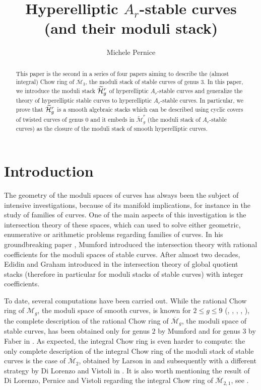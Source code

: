 \documentclass{alggeom}
\numberwithin{equation}{section}
\numberwithin{subsection}{section}
\theoremstyle{definition}
\theoremstyle{remark}
\newcommand\cM{\mathcal{M}} \newcommand\cN{\mathcal{N}}
\newcommand{\Mbar}{\overline{\cM}}
\newcommand{\Mtilde}{\widetilde{\mathcal M}}
\newcommand{\Htilde}{\widetilde{\cH}}
\begin{document}
\title{Hyperelliptic $A_r$-stable curves \\(and their moduli stack)}
\author{Michele Pernice}
\address{KTH, Room 1642, Lindstedtsv\"agen 25,
114 28, Stockholm }



\begin{abstract}
	This paper is the second in a series of four papers aiming to describe the (almost integral) Chow ring of $\Mbar_3$, the moduli stack of stable curves of genus $3$. In this paper, we introduce the moduli stack $\Htilde_g^r$ of hyperelliptic $A_r$-stable curves and generalize the theory of hyperelliptic stable curves to hyperelliptic $A_r$-stable curves. In particular, we prove that $\Htilde_g^r$ is a smooth algebraic stacks which can be described using cyclic covers of twisted curves of genus $0$ and it embeds in $\Mtilde_g^r$ (the moduli stack of $A_r$-stable curves) as the closure of the moduli stack of smooth hyperelliptic curves.
\end{abstract}

\maketitle
\section*{Introduction}

The geometry of the moduli spaces of curves has always been the subject of intensive investigations, because of its manifold implications, for instance in the study of families of curves. One of the main aspects of this investigation is the intersection theory of these spaces, which can used to solve either geometric, enumerative or arithmetic problems regarding families of curves. In his groundbreaking paper \cite{Mum}, Mumford introduced the intersection theory with rational coefficients for the moduli spaces of stable curves. After almost two decades, Edidin and Graham introduced in \cite{EdGra} the intersection theory of global quotient stacks (therefore in particular for moduli stacks of stable curves) with integer coefficients.

To date, several computations have been carried out. While the rational Chow ring of $\cM_g$, the moduli space of smooth curves, is known for $2\leq g\leq 9$ (\cite{Mum}, \cite{Fab}, \cite{Iza}, \cite{PenVak}, \cite{CanLar}), the complete description of the rational Chow ring of $\Mbar_g$, the moduli space of stable curves, has been obtained only for genus $2$ by Mumford and for genus $3$ by Faber in \cite{Fab}. As expected, the integral Chow ring is even harder to compute: the only complete description of the integral Chow ring of the moduli stack of stable curves is the case of $\Mbar_2$, obtained by Larson in \cite{Lar} and subsequently with a different strategy by Di Lorenzo and Vistoli in \cite{DiLorVis}. It is also worth mentioning the result of Di Lorenzo, Pernice and Vistoli regarding the integral Chow ring of $\Mbar_{2,1}$, see \cite{DiLorPerVis}.
\end{document}
